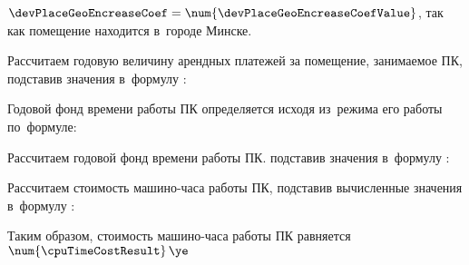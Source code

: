 \(\devPlaceGeoEncreaseCoef = \num{\devPlaceGeoEncreaseCoefValue}\), так как помещение находится в~городе Минске.

Рассчитаем годовую величину арендных платежей за помещение, занимаемое ПК, подставив значения в~формулу :
\devPlaceRentCostFormulaApplied

Годовой фонд времени работы ПК определяется исходя из~режима его работы по~формуле:
\pcWorkabilityFundEquation

Рассчитаем годовой фонд времени работы ПК. подставив значения в~формулу :
\pcWorkabilityFundFormulaApplied

Рассчитаем стоимость машино-часа работы ПК, подставив вычисленные значения в~формулу :
\pcPcHourCostFormulaApplied

Таким образом, стоимость машино-часа работы ПК равняется \(\num{\cpuTimeCostResult} \, \ye\)